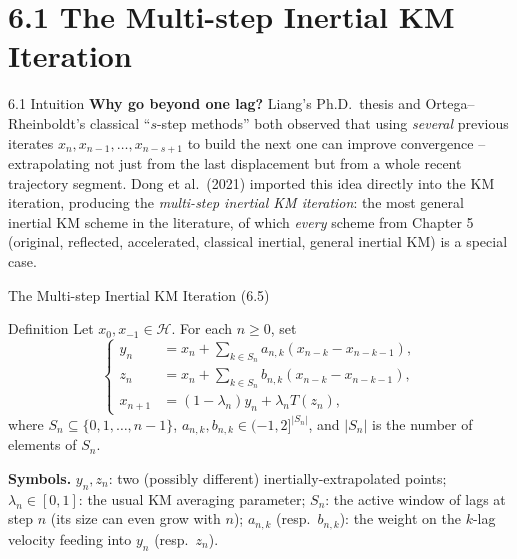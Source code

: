 \documentclass[aspectratio=169,10pt]{beamer}
\newcommand{\Hil}{\mathcal{H}}
\begin{document}
\section{6.1 The Multi-step Inertial KM Iteration}

\begin{frame}{6.1 Intuition}
\textbf{Why go beyond one lag?} Liang's Ph.D.\ thesis and Ortega--Rheinboldt's
classical ``$s$-step methods'' both observed that using \emph{several}
previous iterates $x_n,x_{n-1},\dots,x_{n-s+1}$ to build the next one can
improve convergence -- extrapolating not just from the last displacement but
from a whole recent trajectory segment. Dong et al.\ (2021) imported this
idea directly into the KM iteration, producing the \emph{multi-step
inertial KM iteration}: the most general inertial KM scheme in the
literature, of which \emph{every} scheme from Chapter 5 (original,
reflected, accelerated, classical inertial, general inertial KM) is a
special case.
\end{frame}

\begin{frame}{The Multi-step Inertial KM Iteration (6.5)}
\begin{block}{Definition}
Let $x_0,x_{-1}\in\Hil$. For each $n\ge 0$, set
\[
\left\{
\begin{aligned}
y_n &= x_n + \sum_{k\in S_n} a_{n,k}(x_{n-k}-x_{n-k-1}), \\
z_n &= x_n + \sum_{k\in S_n} b_{n,k}(x_{n-k}-x_{n-k-1}), \\
x_{n+1} &= (1-\lambda_n)y_n + \lambda_n T(z_n),
\end{aligned}
\right.
\]
where $S_n\subseteq\{0,1,\dots,n-1\}$, $a_{n,k},b_{n,k}\in(-1,2]^{|S_n|}$,
and $|S_n|$ is the number of elements of $S_n$.
\end{block}
\textbf{Symbols.} $y_n,z_n$: two (possibly different) inertially-extrapolated
points; $\lambda_n\in[0,1]$: the usual KM averaging parameter; $S_n$: the
active window of lags at step $n$ (its size can even grow with $n$);
$a_{n,k}$ (resp.\ $b_{n,k}$): the weight on the $k$-lag velocity feeding
into $y_n$ (resp.\ $z_n$).
\end{frame}
\end{document}
